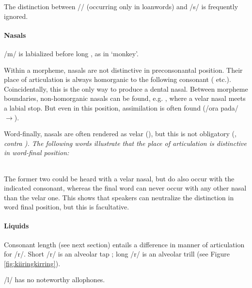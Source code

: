 The distinction between /\textesh/ (occurring only in loanwords) and /s/ is frequently ignored.

\paragraph{Nasals}
/m/ is  labialized before long , as in  `monkey'.


Within a morpheme, nasals are not distinctive in preconsonantal position. Their place of articulation is always homorganic to the following consonant ( etc.). Coincidentally, this is the only way to produce a dental nasal.  Between morpheme boundaries, non-homorganic nasals can be found, e.g. , where a velar nasal meets a labial stop. But even in this position, assimilation is often found (/ora\ng{} pada/$\to$).

Word-finally,  nasals are often rendered as velar (), but this is not obligatory (\citet{Bichsel,Saldin2001,SmithEtAl2004}, \em contra \em \citet{Adelaar1991}). The following words illustrate that the place of articulation is distinctive in word-final position:


 \\

The former two could be heard with a velar nasal, but do also occur with the indicated consonant, whereas the final word can never occur with any other nasal than the velar one. This shows that speakers can neutralize the distinction in word final position, but this is facultative.


\paragraph{Liquids}
Consonant length (see next section) entails a difference in manner of articulation for /r/. Short /r/ is an alveolar tap ; long /r/ is an alveolar trill  (see Figure \ref{fig:kiiringkirring}).

/l/ has no noteworthy allophones.

